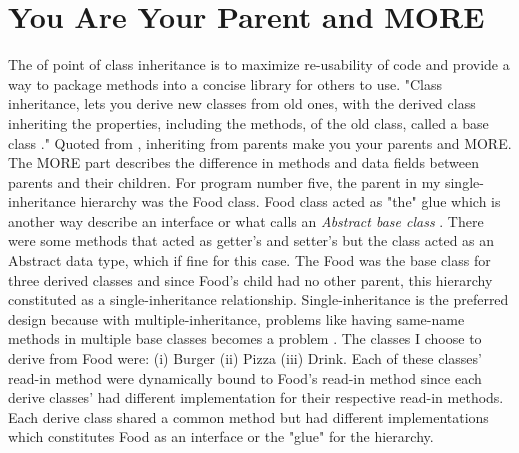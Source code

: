 \documentclass[a4paper,man,biblatex]{apa6}
\begin{document}
\section*{You Are Your Parent and MORE}
The of point of class inheritance is to maximize re-usability of code and provide a way to package methods into a concise library for others to use. "Class inheritance, lets you derive new classes from old ones, with the derived class inheriting the properties, including the methods, of the old class, called a base class \autocite[708]{prata_c_2012}." Quoted from , inheriting from parents make you your parents and MORE. The MORE part describes the difference in methods and data fields between parents and their children. For program number five, the parent in my single-inheritance hierarchy was the Food class. Food class acted as "the" glue which is another way describe an interface or what  calls an \textit{Abstract base class} \autocite[749]{prata_c_2012}. There were some methods that acted as getter's and setter's but the class acted as an Abstract data type, which if fine for this case. The Food was the base class for three derived classes and since Food's child had no other parent, this hierarchy constituted as a single-inheritance relationship. Single-inheritance is the preferred design because with multiple-inheritance, problems like having same-name methods in multiple base classes becomes a problem \autocite[809]{prata_c_2012}. The classes I choose to derive from Food were: (i) Burger (ii) Pizza (iii) Drink. Each of these classes' read-in method were dynamically bound to Food's read-in method since each derive classes' had different implementation for their respective read-in methods. Each derive class shared a common method but had different implementations which constitutes Food as an interface or the "glue" for the hierarchy. \\
\end{document}
